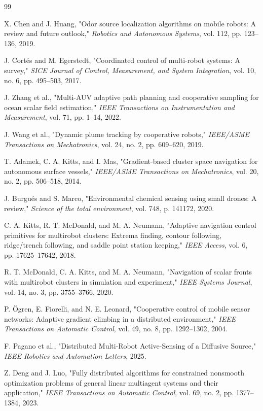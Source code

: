 \documentclass[lettersize,journal]{IEEEtran}
\begin{document}
\begin{thebibliography}{99}

 X. Chen and J. Huang, "Odor source localization algorithms on mobile robots: A review and future outlook," \textit{Robotics and Autonomous Systems}, vol. 112, pp. 123--136, 2019.

 J. Cortés and M. Egerstedt, "Coordinated control of multi-robot systems: A survey," \textit{SICE Journal of Control, Measurement, and System Integration}, vol. 10, no. 6, pp. 495--503, 2017.

 J. Zhang et al., "Multi-AUV adaptive path planning and cooperative sampling for ocean scalar field estimation," \textit{IEEE Transactions on Instrumentation and Measurement}, vol. 71, pp. 1--14, 2022.

 J. Wang et al., "Dynamic plume tracking by cooperative robots," \textit{IEEE/ASME Transactions on Mechatronics}, vol. 24, no. 2, pp. 609--620, 2019.

 T. Adamek, C. A. Kitts, and I. Mas, "Gradient-based cluster space navigation for autonomous surface vessels," \textit{IEEE/ASME Transactions on Mechatronics}, vol. 20, no. 2, pp. 506--518, 2014.

 J. Burgués and S. Marco, "Environmental chemical sensing using small drones: A review," \textit{Science of the total environment}, vol. 748, p. 141172, 2020.

 C. A. Kitts, R. T. McDonald, and M. A. Neumann, "Adaptive navigation control primitives for multirobot clusters: Extrema finding, contour following, ridge/trench following, and saddle point station keeping," \textit{IEEE Access}, vol. 6, pp. 17625--17642, 2018.

 R. T. McDonald, C. A. Kitts, and M. A. Neumann, "Navigation of scalar fronts with multirobot clusters in simulation and experiment," \textit{IEEE Systems Journal}, vol. 14, no. 3, pp. 3755--3766, 2020.

 P. Ögren, E. Fiorelli, and N. E. Leonard, "Cooperative control of mobile sensor networks: Adaptive gradient climbing in a distributed environment," \textit{IEEE Transactions on Automatic Control}, vol. 49, no. 8, pp. 1292--1302, 2004.

 F. Pagano et al., "Distributed Multi-Robot Active-Sensing of a Diffusive Source," \textit{IEEE Robotics and Automation Letters}, 2025.

 Z. Deng and J. Luo, "Fully distributed algorithms for constrained nonsmooth optimization problems of general linear multiagent systems and their application," \textit{IEEE Transactions on Automatic Control}, vol. 69, no. 2, pp. 1377--1384, 2023.


\end{thebibliography}
\end{document}
